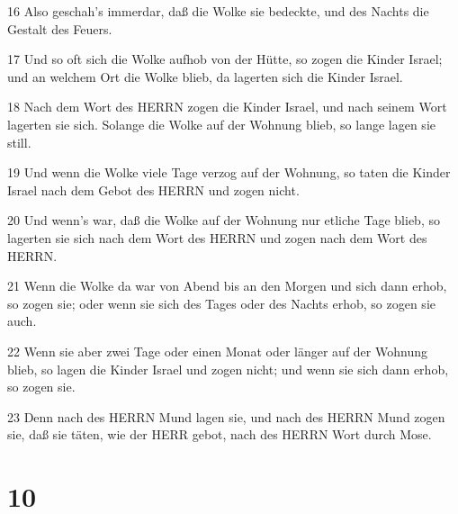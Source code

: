 \par 16 Also geschah's immerdar, daß die Wolke sie bedeckte, und des Nachts die Gestalt des Feuers.
\par 17 Und so oft sich die Wolke aufhob von der Hütte, so zogen die Kinder Israel; und an welchem Ort die Wolke blieb, da lagerten sich die Kinder Israel.
\par 18 Nach dem Wort des HERRN zogen die Kinder Israel, und nach seinem Wort lagerten sie sich. Solange die Wolke auf der Wohnung blieb, so lange lagen sie still.
\par 19 Und wenn die Wolke viele Tage verzog auf der Wohnung, so taten die Kinder Israel nach dem Gebot des HERRN und zogen nicht.
\par 20 Und wenn's war, daß die Wolke auf der Wohnung nur etliche Tage blieb, so lagerten sie sich nach dem Wort des HERRN und zogen nach dem Wort des HERRN.
\par 21 Wenn die Wolke da war von Abend bis an den Morgen und sich dann erhob, so zogen sie; oder wenn sie sich des Tages oder des Nachts erhob, so zogen sie auch.
\par 22 Wenn sie aber zwei Tage oder einen Monat oder länger auf der Wohnung blieb, so lagen die Kinder Israel und zogen nicht; und wenn sie sich dann erhob, so zogen sie.
\par 23 Denn nach des HERRN Mund lagen sie, und nach des HERRN Mund zogen sie, daß sie täten, wie der HERR gebot, nach des HERRN Wort durch Mose.

\chapter{10}

